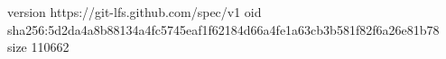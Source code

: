 version https://git-lfs.github.com/spec/v1
oid sha256:5d2da4a8b88134a4fc5745eaf1f62184d66a4fe1a63cb3b581f82f6a26e81b78
size 110662
